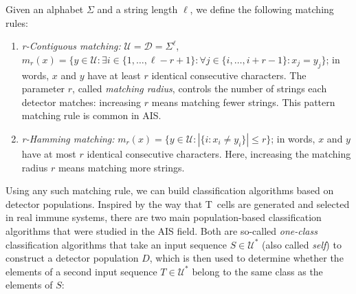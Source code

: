 \documentclass{llncs}
\begin{document}
\begin{definition}
Given an alphabet $\Sigma$ and a string length $\ell$, we define the following matching rules:
\begin{enumerate}
 \item \emph{r-Contiguous matching:}  $\mathcal{U}=\mathcal{D}=\Sigma^\ell$, $m_r(x)=\{y \in \mathcal{U} : \exists i \in \{1,\ldots,\ell-r+1\} : \forall j \in \{i,\ldots,i+r-1\} : x_j = y_j \}$; in words, $x$ and $y$ have at least $r$ identical
consecutive characters. 
 The parameter $r$, called \emph{matching radius}, controls the number of strings each 
 detector matches: increasing $r$ means matching fewer strings. This pattern matching 
 rule is common in AIS.
\item \emph{r-Hamming matching:} $m_r(x)=\{y \in \mathcal{U} : |\{ i : x_i \neq y_i \}| \leq r \}$;
in words,  $x$ and $y$ have at most $r$ identical
consecutive characters. 
Here, increasing the matching radius $r$ means matching more strings.
\end{enumerate}
\label{definitionmatchingrules} %
\end{definition}

Using any such matching rule, we can build classification algorithms based on detector 
populations. 
Inspired by the way that T~cells are generated and selected in real immune systems,
there are two main population-based classification algorithms that were studied in the AIS field. 
Both are so-called \emph{one-class} classification algorithms that take an input 
sequence $S \in \mathcal{U}^*$ (also called \emph{self}) to construct a detector population $D$, 
which is then used to determine whether the elements of a second input sequence $T \in \mathcal{U}^*$ 
belong to the same class as the elements of $S$:
\end{document}
